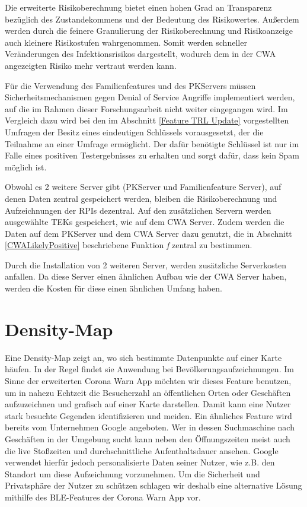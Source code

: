 \documentclass[conference,compsoc]{IEEEtran}
\begin{document}
Die erweiterte Risikoberechnung bietet einen hohen Grad an Transparenz bezüglich des Zustandekommens und der Bedeutung des Risikowertes. 
Außerdem werden durch die feinere Granulierung der Risikoberechnung und Risikoanzeige auch kleinere Risikostufen wahrgenommen. 
Somit werden schneller Veränderungen des Infektionsrisikos dargestellt, wodurch dem in der CWA angezeigten Risiko mehr vertraut werden kann.

Für die Verwendung des Familienfeatures und des PKServers müssen Sicherheitsmechanismen gegen Denial of Service Angriffe implementiert werden, 
auf die im Rahmen dieser Forschungsarbeit nicht weiter eingegangen wird.
Im Vergleich dazu wird bei den im Abschnitt \ref{Feature TRL Update} vorgestellten Umfragen der Besitz eines eindeutigen Schlüssels vorausgesetzt,
der die Teilnahme an einer Umfrage ermöglicht. Der dafür benötigte Schlüssel ist nur im Falle eines positiven Testergebnisses zu erhalten und sorgt dafür, dass kein Spam möglich ist.

Obwohl es 2 weitere Server gibt (PKServer und Familienfeature Server), auf denen Daten zentral gespeichert werden, bleiben die Risikoberechnung und Aufzeichnungen der RPIs dezentral. 
Auf den zusätzlichen Servern werden ausgewählte TEKs gespeichert, wie auf dem CWA Server. 
Zudem werden die Daten auf dem PKServer und dem CWA Server dazu genutzt, die in Abschnitt \ref{CWALikelyPositive} beschriebene Funktion \textit{f} zentral zu bestimmen.

Durch die Installation von 2 weiteren Server, werden zusätzliche Serverkosten anfallen. Da diese Server einen ähnlichen Aufbau wie der CWA Server haben, 
werden die Kosten für diese einen ähnlichen Umfang haben. 

\section{Density-Map}
\label{Density_Map}
Eine Density-Map zeigt an, wo sich bestimmte Datenpunkte auf einer Karte häufen. 
In der Regel findet sie Anwendung bei Bevölkerungsaufzeichnungen. 
Im Sinne der erweiterten Corona Warn App möchten wir dieses Feature benutzen, um in nahezu Echtzeit die Besucherzahl an öffentlichen Orten oder Geschäften aufzuzeichnen und grafisch auf einer Karte darstellen. 
Damit kann eine Nutzer stark besuchte Gegenden identifizieren und meiden. 
Ein ähnliches Feature wird bereits vom Unternehmen Google angeboten. 
Wer in dessen Suchmaschine nach Geschäften in der Umgebung sucht kann neben den Öffnungszeiten meist auch die live Stoßzeiten und durchschnittliche Aufenthaltsdauer ansehen. 
Google verwendet hierfür jedoch personalisierte Daten seiner Nutzer, wie z.B. den Standort um diese Aufzeichnung vorzunehmen. 
Um die Sicherheit und Privatsphäre der Nutzer zu schützen schlagen wir deshalb eine alternative Lösung mithilfe des BLE-Features der Corona Warn App vor. \\
\end{document}
